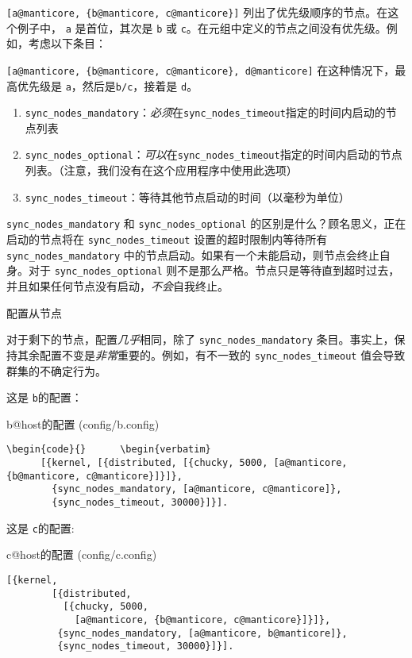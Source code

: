 \texttt{[a@manticore, \{b@manticore, c@manticore\}]}
列出了优先级顺序的节点。在这个例子中， \texttt{a}
是首位，其次是 \texttt{b} 或
\texttt{c}。在元组中定义的节点之间没有优先级。例如，考虑以下条目：

\texttt{[a@manticore, \{b@manticore, c@manticore\}, d@manticore]}
在这种情况下，最高优先级是 \texttt{a}，然后是\texttt{b/c}，接着是 \texttt{d}。
\begin{enumerate}
\item  \texttt{sync\_nodes\_mandatory}：\emph{必须}在\texttt{sync\_nodes\_timeout}指定的时间内启动的节点列表
\item  \texttt{sync\_nodes\_optional}：\emph{可以}在\texttt{sync\_nodes\_timeout}指定的时间内启动的节点列表。（注意，我们没有在这个应用程序中使用此选项）
\item \texttt{sync\_nodes\_timeout}：等待其他节点启动的时间（以毫秒为单位）
\end{enumerate}

\texttt{sync\_nodes\_mandatory} 和
\texttt{sync\_nodes\_optional}
的区别是什么？顾名思义，正在启动的节点将在
\texttt{sync\_nodes\_timeout} 设置的超时限制内等待所有
\texttt{sync\_nodes\_mandatory}
中的节点启动。如果有一个未能启动，则节点会终止自身。对于
\texttt{sync\_nodes\_optional}
则不是那么严格。节点只是等待直到超时过去，并且如果任何节点没有启动，\emph{不会}自我终止。

配置从节点

对于剩下的节点，配置\emph{几乎}相同，除了
\texttt{sync\_nodes\_mandatory}
条目。事实上，保持其余配置不变是\emph{非常}重要的。例如，有不一致的
\texttt{sync\_nodes\_timeout}
值会导致群集的不确定行为。

这是 \texttt{b}的配置：

\begin{code}{b@host的配置 (config/b.config)}
  \begin{verbatim}
\begin{code}{}      \begin{verbatim}
      [{kernel, [{distributed, [{chucky, 5000, [a@manticore, {b@manticore, c@manticore}]}]},
        {sync_nodes_mandatory, [a@manticore, c@manticore]},
        {sync_nodes_timeout, 30000}]}].
\end{verbatim}
  \label{lst:b_host_config}
  \end{code}

这是 \texttt{c}的配置:

\begin{code}{c@host的配置 (config/c.config)}
  \begin{verbatim}
[{kernel,
        [{distributed,
          [{chucky, 5000,
            [a@manticore, {b@manticore, c@manticore}]}]},
         {sync_nodes_mandatory, [a@manticore, b@manticore]},
         {sync_nodes_timeout, 30000}]}].
\end{verbatim}
  \label{lst:c_host_config}
  \end{code}



